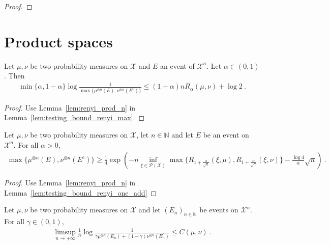 \begin{proof}
\end{proof}


\section{Product spaces}

\begin{corollary}
  \label{cor:testing_bound_renyi_n}
  Let $\mu, \nu$ be two probability measures on $\mathcal X$ and $E$ an event of $\mathcal X^n$. Let $\alpha \in (0,1)$. Then
  \begin{align*}
  \min\{\alpha, 1 - \alpha\} \log\frac{1}{\max\{\mu^{\otimes n}(E), \nu^{\otimes n}(E^c)\}} \le (1 - \alpha) n R_{\alpha}(\mu, \nu)  + \log 2 \: .
  \end{align*}
\end{corollary}

\begin{proof}
Use Lemma~\ref{lem:renyi_prod_n} in Lemma~\ref{lem:testing_bound_renyi_max}.
\end{proof}

\begin{lemma}
  \label{lem:testing_bound_renyi_one_add_n}
  Let $\mu, \nu$ be two probability measures on $\mathcal X$, let $n \in \mathbb{N}$ and let $E$ be an event on $\mathcal X^n$. For all $\alpha > 0$,
  \begin{align*}
  \max\{\mu^{\otimes n}(E), \nu^{\otimes n}(E^c)\} \ge \frac{1}{4}\exp\left( - n \inf_{\xi \in \mathcal P(\mathcal X)}\max\{R_{1+\frac{\alpha}{\sqrt{n}}}(\xi, \mu), R_{1+\frac{\alpha}{\sqrt{n}}}(\xi, \nu)\} - \frac{\log 4}{\alpha}\sqrt{n}\right) \: .
  \end{align*}
\end{lemma}

\begin{proof}
Use Lemma~\ref{lem:renyi_prod_n} in Lemma~\ref{lem:testing_bound_renyi_one_add}
\end{proof}

\begin{theorem}
  \label{thm:testing_bound_chernoff}
  Let $\mu, \nu$ be two probability measures on $\mathcal X$ and let $(E_n)_{n \in \mathbb{N}}$ be events on $\mathcal X^n$. For all $\gamma \in (0,1)$,
  \begin{align*}
  \limsup_{n \to +\infty} \frac{1}{n}\log \frac{1}{\gamma \mu^{\otimes n}(E_n) + (1 - \gamma)\nu^{\otimes n}(E_n^c)}
  \le C(\mu, \nu)
  \: .
  \end{align*}
\end{theorem}

